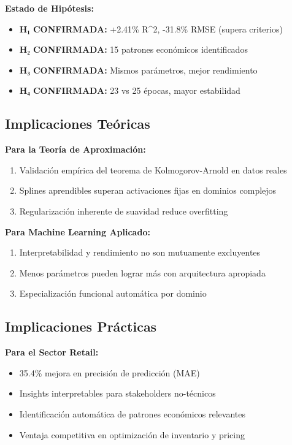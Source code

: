 \documentclass[10pt,twocolumn]{article}
\newcommand{\rsquared}{R^2}
\begin{document}
\textbf{Estado de Hipótesis:}
\begin{itemize}
    \item[\checkmark] \textbf{H₁ CONFIRMADA:} +2.41\% \rsquared, -31.8\% RMSE (supera criterios)
    \item[\checkmark] \textbf{H₂ CONFIRMADA:} 15 patrones económicos identificados
    \item[\checkmark] \textbf{H₃ CONFIRMADA:} Mismos parámetros, mejor rendimiento
    \item[\checkmark] \textbf{H₄ CONFIRMADA:} 23 vs 25 épocas, mayor estabilidad
\end{itemize}

\subsection{Implicaciones Teóricas}

\textbf{Para la Teoría de Aproximación:}
\begin{enumerate}
    \item Validación empírica del teorema de Kolmogorov-Arnold en datos reales
    \item Splines aprendibles superan activaciones fijas en dominios complejos
    \item Regularización inherente de suavidad reduce overfitting
\end{enumerate}

\textbf{Para Machine Learning Aplicado:}
\begin{enumerate}
    \item Interpretabilidad y rendimiento no son mutuamente excluyentes
    \item Menos parámetros pueden lograr más con arquitectura apropiada
    \item Especialización funcional automática por dominio
\end{enumerate}

\subsection{Implicaciones Prácticas}

\textbf{Para el Sector Retail:}
\begin{itemize}
    \item 35.4\% mejora en precisión de predicción (MAE)
    \item Insights interpretables para stakeholders no-técnicos
    \item Identificación automática de patrones económicos relevantes
    \item Ventaja competitiva en optimización de inventario y pricing
\end{itemize}
\end{document}
